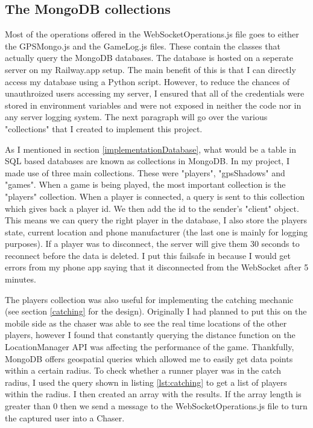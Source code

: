 \documentclass{l4proj}
\begin{document}
\subsection{The MongoDB collections}
\label{mongocollections}
Most of the operations offered in the WebSocketOperations.js file goes to either the GPSMongo.js and the GameLog.js
files. These contain the classes that actually query the MongoDB databases. The database is hosted on a seperate
server on my Railway.app setup. The main benefit of this is that I can directly access my database using a Python
script. However, to reduce the chances of unauthroized users accessing my server, I ensured that all of the credentials
were stored in environment variables and were not exposed in neither the code nor in any server logging system. The
next paragraph will go over the various "collections" that I created to implement this project.

As I mentioned in section \ref{implementationDatabase}, what would be a table in SQL based databases are known as collections in MongoDB.
In my project, I made use of three main collections. These were "players", "gpsShadows" and "games". When a game is being played, the most
important collection is the "players" collection. When a player is connected, a query is sent to this collection which gives back a player id.
We then add the id to the sender's "client" object. This means we can query the right player in the database, I also store the players state,
current location and phone manufacturer (the last one is mainly for logging purposes). If a player was to disconnect, the server will give
them 30 seconds to reconnect before the data is deleted. I put this failsafe in because I would get errors from my phone app saying
that it disconnected from the WebSocket after 5 minutes.

The players collection was also useful for implementing the catching mechanic (see section \ref{catching} for the design). Originally I had planned to put this on the mobile side
as the chaser was able to see the real time locations of the other players, however I found that constantly querying the distance function
on the LocationManager API was affecting the performance of the game. Thankfully, MongoDB offers geospatial queries which allowed me to
easily get data points within a certain radius. To check whether a runner player was in the catch radius, I used the query shown in
listing \ref{lst:catching} to get a list of players within the radius. I then created an array with the results. If the array length is greater
than 0 then we send a message to the WebSocketOperations.js file to turn the captured user into a Chaser.
\end{document}
